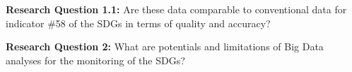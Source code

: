 			\bigskip
				
				\begin{tcolorbox}
					\textbf{Research Question 1.1:} \smallskip Are these data comparable to conventional data for indicator \#58 of the SDGs in terms of quality and accuracy?
				\end{tcolorbox}
				
			\bigskip
				
				\begin{tcolorbox}
					\textbf{Research Question 2:} \smallskip What are potentials and limitations of Big Data analyses for the monitoring of the SDGs?
				\end{tcolorbox}

			\bigskip
				
	
			